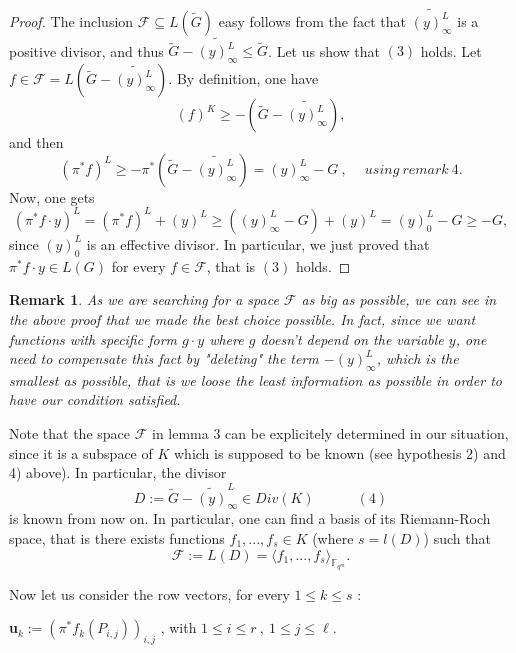 \documentclass[10pt]{article}
\newtheorem{rq1}{Remark}[]
\newcommand{\s}{\vspace{0.3cm}}
\newcommand{\cd}{\cdot}
\newcommand{\fqm}{\mathbb{F}_{q^m}}
\newcommand{\su}{\subseteq}
\begin{document}
\begin{proof}
The inclusion $\mathcal{F} \su L(\tilde{G})$ easy follows from the fact that $\widetilde{(y)^L_{\infty}}$ is a positive divisor, and thus $\tilde{G}-\widetilde{(y)^L_{\infty}} \leq \tilde{G}$. Let us show that $(3)$ holds. Let $f \in \mathcal{F} =  L\left(\tilde{G}-\widetilde{(y)^L_{\infty}}\right)$. By definition, one have 
\[(f)^K \geq -\left(\tilde{G}-\widetilde{(y)^L_{\infty}}\right),\]
and then 
\[(\pi^*f)^L \geq -\pi^*\left(\tilde{G}-\widetilde{(y)^L_{\infty}}\right) = (y)^L_{\infty} - G \ , \ \quad using \ remark \ 4.\]
Now, one gets 
\[(\pi^*f \cd y)^L = (\pi^*f)^L  + (y)^L \geq  ((y)^L_{\infty} - G)+(y)^L = (y)^L_0 - G \geq -G,\]
since $(y)^L_0$ is an effective divisor. In particular, we just proved that $\pi^*f \cd y \in L(G)$ for every $f \in \mathcal{F}$, that is $(3)$ holds.
\end{proof}

\s

\begin{rq1} \rm
As we are searching for a space $\mathcal{F}$ as big as possible, we can see in the above proof that we made the best choice possible. In fact, since we want functions with specific form $g \cd y$ where $g$ doesn't depend on the variable $y$, one need to compensate this fact by "deleting" the term $-(y)^L_{\infty}$, which is the smallest as possible, that is we loose the least information as possible in order to have our condition satisfied. 
\end{rq1}

\s

Note that the space $\mathcal{F}$ in lemma $3$ can be explicitely determined in our situation, since it is a subspace of $K$ which is supposed to be known (see hypothesis 2) and 4) above). In particular, the divisor 
\[D := \tilde{G} - \widetilde{(y)}^L_{\infty} \in Div(K) \quad \quad \quad (4)\]
is known from now on. In particular, one can find a basis of its Riemann-Roch space, that is there exists functions $f_1,...,f_s \in K$ (where $s=l(D)$) such that 
\[\mathcal{F} := L(D) = \langle f_1,...,f_s \rangle_{\fqm}.\]

Now let us consider the row vectors, for every $1 \leq k \leq s$ :
\begin{center}
\textbf{u}$_{k}:= \left(\pi^*f_k(P_{i,j})\right)_{i,j}$ , with $1 \leq i \leq r \ , \ 1 \leq j \leq \ell$.
\end{center}
\end{document}
